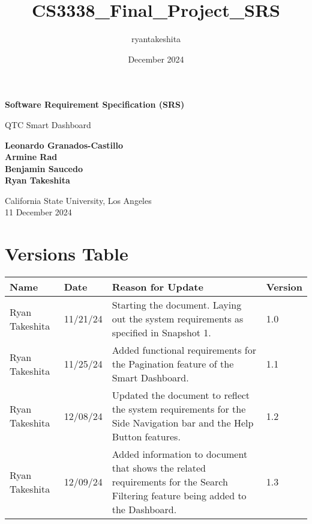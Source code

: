\documentclass{article}
\title{CS3338_Final_Project_SRS}
\author{ryantakeshita }
\date{December 2024}
\begin{document}
\begin{titlepage}
   \begin{center}
       \vspace*{1cm}

       \textbf{Software Requirement Specification (SRS)}

       \vspace{0.5cm}
        QTC Smart Dashboard
            
       \vspace{1.5cm}

       \textbf{Leonardo Granados-Castillo\\Armine Rad\\Benjamin Saucedo\\Ryan Takeshita}

       \vfill
            
            
       \vspace{0.8cm}

       California State University, Los Angeles\\
       11 December 2024
            
   \end{center}
\end{titlepage}


\tableofcontents
\setcounter{}
\renewcommand{\cftsecfont}{\bfseries}
\renewcommand{\cftsubsecfont}{\itshape}

\pagebreak

\section{Versions Table}


\begin{tabular}{ | m{5em} | m{2cm}| m{7cm} | m{2cm} | } 
  \hline
  Name & Date & Reason for Update & Version\\ 
  \hline
  Ryan Takeshita & 11/21/24 & Starting the document. Laying out the system requirements as specified in Snapshot 1. & 1.0 \\ 
  \hline
  Ryan Takeshita & 11/25/24 & Added functional requirements for the Pagination feature of the Smart Dashboard. & 1.1\\ 
  \hline
  Ryan Takeshita & 12/08/24 & Updated the document to reflect the system requirements for the Side Navigation bar and the Help Button features. & 1.2\\ 
  \hline
  Ryan Takeshita & 12/09/24 & Added information to document that shows the related requirements for the Search Filtering feature being added to the Dashboard.& 1.3\\
  \hline
\end{tabular}
\pagebreak
\end{document}
